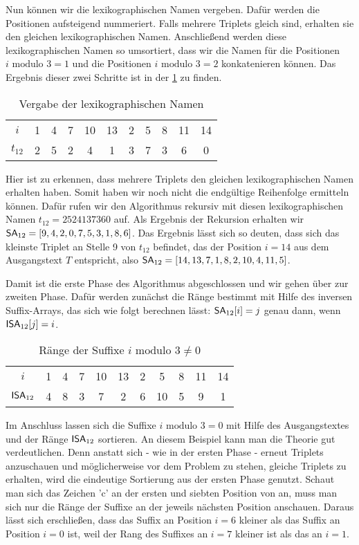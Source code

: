 Nun können wir die lexikographischen Namen vergeben. Dafür werden die Positionen aufsteigend nummeriert. Falls mehrere Triplets gleich sind, erhalten sie den gleichen lexikographischen Namen. Anschließend werden diese lexikographischen Namen so umsortiert, dass wir die Namen für die Positionen $i \text{ modulo } 3 = 1$ und die Positionen $i \text{ modulo } 3 = 2$ konkatenieren können. Das Ergebnis dieser zwei Schritte ist in der \cref{tab:lexNamen} zu finden.

\begin{table}[H]
	\centering
	\begin{tabular}{c| c c c c c c c c c c}
		$i$ & 1 & 4 & 7 & 10 & 13 & 2 & 5 & 8 & 11 & 14\\
		$t_{12}$ & 2 & 5 & 2 & 4 & 1 & 3 & 7 & 3 & 6 & 0
	\end{tabular}
	\caption{Vergabe der lexikographischen Namen}
	\label{tab:lexNamen}
\end{table}

Hier ist zu erkennen, dass mehrere Triplets den gleichen lexikographischen Namen erhalten haben. Somit haben wir noch nicht die endgültige Reihenfolge ermitteln können. Dafür rufen wir den Algorithmus rekursiv mit diesen lexikographischen Namen $t_{12} = 2524137360$ auf. Als Ergebnis der Rekursion erhalten wir $\sa_{12} = [9, 4, 2, 0, 7, 5, 3, 1, 8, 6]$. Das Ergebnis lässt sich so deuten, dass sich das kleinste Triplet an Stelle 9 von $t_{12}$ befindet, das der Position $i = 14$ aus dem Ausgangstext $T$ entspricht, also $\sa_{12} = [14, 13, 7, 1, 8, 2, 10, 4, 11, 5]$. 

Damit ist die erste Phase des Algorithmus abgeschlossen und wir gehen über zur zweiten Phase. Dafür werden zunächst die Ränge bestimmt mit Hilfe des inversen Suffix-Arrays, das sich wie folgt berechnen lässt: $\sa_{12}[i] = j$ genau dann, wenn $\isa_{12}[j] = i$.

\begin{table}[H]
	\centering
	\begin{tabular}{c| c c c c c c c c c c}
		$i$ & 1 & 4 & 7 & 10 & 13 & 2 & 5 & 8 & 11 & 14 \\
		$\isa_{12}$ & 4 & 8 & 3 & 7 & 2 & 6 & 10 & 5 & 9 & 1
	\end{tabular}
	\caption{Ränge der Suffixe $i \text{ modulo } 3 \neq 0$}
	\label{tab:ergebnis_rek}
\end{table}

Im Anschluss lassen sich die Suffixe $i \text{ modulo } 3 = 0$ mit Hilfe des Aus\-gangs\-text\-es  und der Ränge $\isa_{12}$ sortieren. An diesem Beispiel kann man die Theorie gut verdeutlichen. Denn anstatt sich - wie in der ersten Phase - erneut Triplets anzuschauen und möglicherweise vor dem Problem zu stehen, gleiche Triplets zu erhalten, wird die eindeutige Sortierung aus der ersten Phase genutzt. Schaut man sich das Zeichen 'c' an der ersten und siebten Position von  an, muss man sich nur die Ränge der Suffixe an der jeweils nächsten Position anschauen. Daraus lässt sich erschließen, dass das Suffix an Position $i = 6$ kleiner als das Suffix an Position $i = 0$ ist, weil der Rang des Suffixes an $i = 7$ kleiner ist als das an $i = 1$.

